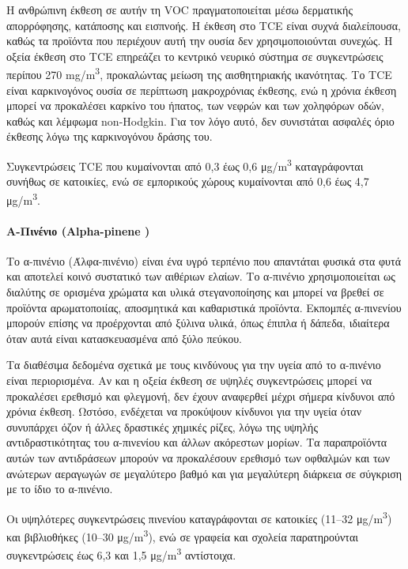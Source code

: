 Η ανθρώπινη έκθεση σε αυτήν τη VOC πραγματοποιείται μέσω δερματικής απορρόφησης, κατάποσης και εισπνοής. Η έκθεση στο TCE είναι συχνά διαλείπουσα, καθώς τα προϊόντα που περιέχουν αυτή την ουσία δεν χρησιμοποιούνται συνεχώς. Η οξεία έκθεση στο TCE επηρεάζει το κεντρικό νευρικό σύστημα σε συγκεντρώσεις περίπου 270 mg/m\textsuperscript{3}, προκαλώντας μείωση της αισθητηριακής ικανότητας. Το TCE είναι καρκινογόνος ουσία σε περίπτωση μακροχρόνιας έκθεσης, ενώ η χρόνια έκθεση μπορεί να προκαλέσει καρκίνο του ήπατος, των νεφρών και των χοληφόρων οδών, καθώς και λέμφωμα non-Hodgkin. Για τον λόγο αυτό, δεν συνιστάται ασφαλές όριο έκθεσης λόγω της καρκινογόνου δράσης του.

Συγκεντρώσεις TCE που κυμαίνονται από 0,3 έως 0,6 μg/m\textsuperscript{3} καταγράφονται συνήθως σε κατοικίες, ενώ σε εμπορικούς χώρους κυμαίνονται από 0,6 έως 4,7 μg/m\textsuperscript{3}.

\paragraph{Α-Πινένιο (Alpha-pinene )}

Το α-πινένιο (Άλφα-πινένιο) είναι ένα υγρό τερπένιο που απαντάται φυσικά στα φυτά και αποτελεί κοινό συστατικό των αιθέριων ελαίων. Το  α-πινένιο χρησιμοποιείται ως διαλύτης σε ορισμένα χρώματα και υλικά στεγανοποίησης και μπορεί να βρεθεί σε προϊόντα αρωματοποιίας, αποσμητικά και καθαριστικά προϊόντα. Εκπομπές  α-πινενίου μπορούν επίσης να προέρχονται από ξύλινα υλικά, όπως έπιπλα ή δάπεδα, ιδιαίτερα όταν αυτά είναι κατασκευασμένα από ξύλο πεύκου.

Τα διαθέσιμα δεδομένα σχετικά με τους κινδύνους για την υγεία από το α-πινένιο είναι περιορισμένα. Αν και η οξεία έκθεση σε υψηλές συγκεντρώσεις μπορεί να προκαλέσει ερεθισμό και φλεγμονή, δεν έχουν αναφερθεί μέχρι σήμερα κίνδυνοι από χρόνια έκθεση. Ωστόσο, ενδέχεται να προκύψουν κίνδυνοι για την υγεία όταν συνυπάρχει όζον ή άλλες δραστικές χημικές ρίζες, λόγω της υψηλής αντιδραστικότητας του  α-πινενίου και άλλων ακόρεστων μορίων. Τα παραπροϊόντα αυτών των αντιδράσεων μπορούν να προκαλέσουν ερεθισμό των οφθαλμών και των ανώτερων αεραγωγών σε μεγαλύτερο βαθμό και για μεγαλύτερη διάρκεια σε σύγκριση με το ίδιο το α-πινένιο.

Οι υψηλότερες συγκεντρώσεις πινενίου καταγράφονται σε κατοικίες (11–32 μg/m\textsuperscript{3}) και βιβλιοθήκες (10–30 μg/m\textsuperscript{3}), ενώ σε γραφεία και σχολεία παρατηρούνται συγκεντρώσεις έως 6,3 και 1,5 μg/m\textsuperscript{3} αντίστοιχα.

